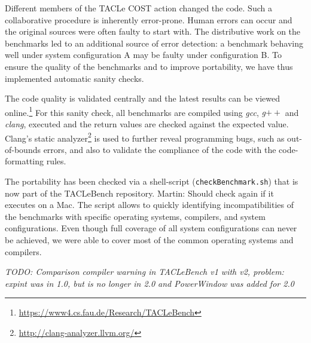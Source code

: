 \documentclass[a4paper,UKenglish]{oasics}
\newcommand{\todo}[1]{{\emph{TODO: #1}}}
\newcommand{\martin}[1]{{\color{blue} Martin: #1}}
\newcommand{\code}[1]{{\small{\texttt{#1}}}}
\begin{document}
Different members of the TACLe COST action changed the code.
Such a collaborative procedure is inherently error-prone.
Human errors can occur and the original sources were often faulty to start with.
The distributive work on the benchmarks led to an additional source of error detection:
a benchmark behaving well under system configuration A may be faulty under configuration B.
To ensure the quality of the benchmarks and to improve portability, we have thus implemented automatic sanity checks.

The code quality
is validated centrally and the latest results can be viewed online.\footnote{\url{https://www4.cs.fau.de/Research/TACLeBench}}
For this sanity check, all benchmarks are compiled using \textit{gcc}, \textit{g$++$} and \textit{clang}, executed and the return values are checked against the expected value.
Clang's static analyzer\footnote{\url{http://clang-analyzer.llvm.org/}} is used to further reveal programming bugs, such as out-of-bounds errors, and also to validate the compliance of the code with the code-formatting rules.

The portability has been checked via a shell-script (\code{checkBenchmark.sh}) that is now part of the TACLeBench repository.
\martin{Should check again if it executes on a Mac.}
The script allows to quickly identifying incompatibilities of the benchmarks with specific operating systems, compilers, and system configurations.
Even though full coverage of all system configurations can never be achieved, we were able to cover most of the common operating systems and compilers.


\todo{Comparison compiler warning in TACLeBench v1 with v2, problem: expint was in 1.0, but is no
longer in 2.0 and PowerWindow was added for 2.0}

%
\end{document}
